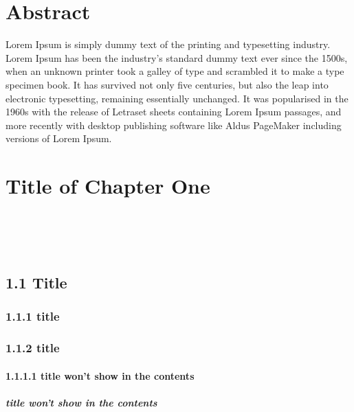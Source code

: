 \documentclass[a4paper,12pt,UTF8,openright]{book}
\begin{document}
\chapter*{Abstract}

Lorem Ipsum is simply dummy text of the printing and typesetting industry. Lorem Ipsum has been the industry's standard dummy text ever since the 1500s, when an unknown printer took a galley of type and scrambled it to make a type specimen book. It has survived not only five centuries, but also the leap into electronic typesetting, remaining essentially unchanged. It was popularised in the 1960s with the release of Letraset sheets containing Lorem Ipsum passages, and more recently with desktop publishing software like Aldus PageMaker including versions of Lorem Ipsum.~\cite{Weir04}

\mainmatter
\chapter{Title of Chapter One}

 \\
 \\
 \\

\lipsum[1-5]

\section{1.1 Title}
\lipsum[1-3]

\subsection{1.1.1 title}
\lipsum[1-3]

\subsection{1.1.2 title}
\lipsum[1-3]

\subsubsection{1.1.1.1 title won't show in the contents}
\lipsum[1-3]

\paragraph{title won't show in the contents}
\lipsum[1-5]
\end{document}
